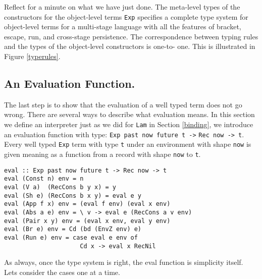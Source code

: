 \documentclass{sigplanconf}
\begin{document}
Reflect for a minute on what we have just done. The meta-level types of the
constructors for the object-level terms {\tt Exp} specifies a complete type
system for object-level terms for a multi-stage language with all the features
of bracket, escape, run, and cross-stage persistence. The correspondence
between typing rules and the types of the object-level constructors is one-to-
one. This is illustrated in Figure \ref{typerules}.

\subsection{An Evaluation Function.}

The last step is to show that the evaluation of a well typed term
does not go wrong. There are several ways to describe what evaluation
means. In this section we define an
interpreter just as we did for {\tt Lam} in Section
\ref{binding}, we introduce an evaluation function with type:
\verb+Exp past now future t ->+ \verb+Rec now -> t+. Every well
typed {\tt Exp} term with type {\tt t} under an environment with shape {\tt now} is given
meaning as a function from a record with shape {\tt now} to {\tt t}.


\begin{verbatim}
eval :: Exp past now future t -> Rec now -> t
eval (Const n) env = n
eval (V a)  (RecCons b y x) = y
eval (Sh e) (RecCons b x y) = eval e y
eval (App f x) env = (eval f env) (eval x env)
eval (Abs a e) env = \ v -> eval e (RecCons a v env)
eval (Pair x y) env = (eval x env, eval y env)
eval (Br e) env = Cd (bd (EnvZ env) e)
eval (Run e) env = case eval e env of 
                     Cd x -> eval x RecNil
\end{verbatim}

As always, once the type system is right, the eval function is
simplicity itself. Lets consider the cases one at a time.
\end{document}
